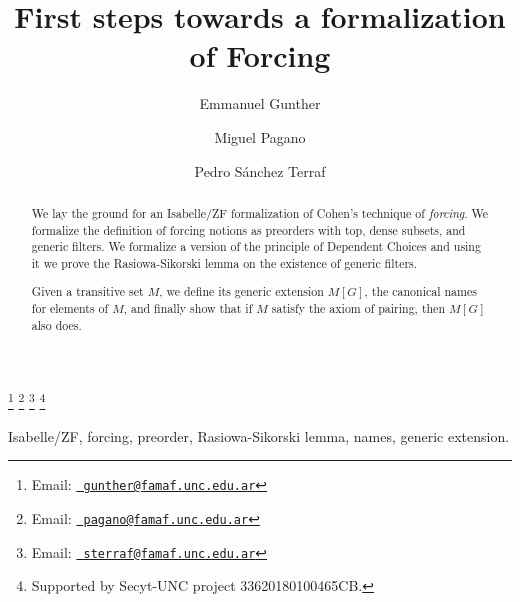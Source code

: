 \documentclass[9pt]{entcs} \usepackage{entcsmacro}
\begin{document}
\begin{frontmatter}
  \title{First steps towards a formalization of Forcing}
  \author{Emmanuel Gunther%
    }
  \address{FaMAF\\ Universidad Nacional de C\'ordoba\\
    C\'ordoba, Argentina} \author{Miguel Pagano}
  \address{FaMAF\\Universidad Nacional de C\'ordoba\\
    C\'ordoba, Argentina}
  \author{Pedro S\'anchez Terraf}
  \address{CIEM-FaMAF\\Universidad Nacional de C\'ordoba\\
    C\'ordoba, Argentina}
 \thanks[myemail]{Email:
    \href{mailto:gunther@famaf.unc.edu.ar} {\texttt{\normalshape
        gunther@famaf.unc.edu.ar}}} \thanks[coemail]{Email:
    \href{mailto:pagano@famaf.unc.edu.ar} {\texttt{\normalshape
        pagano@famaf.unc.edu.ar}}}  \thanks[co2email]{Email:
    \href{mailto:sterraf@famaf.unc.edu.ar} {\texttt{\normalshape
        sterraf@famaf.unc.edu.ar}}} 
 \thanks[ALL]{Supported by Secyt-UNC project 33620180100465CB.} 
\begin{abstract} 
  We lay the ground for an Isabelle/ZF formalization of Cohen's technique of
  \emph{forcing}. We formalize the definition of forcing notions as
  preorders with top, dense subsets, and generic filters. We formalize
  a version of the principle of Dependent Choices and using it
  we prove the Rasiowa-Sikorski lemma on the existence of generic filters.
  
  Given a transitive set $M$, we define its generic extension $M[G]$,
  the canonical names for elements of $M$, and finally show that if $M$
  satisfy the axiom of pairing, then $M[G]$ also does.
\end{abstract}
\begin{keyword}
Isabelle/ZF, forcing, preorder, Rasiowa-Sikorski lemma, names, generic extension.
\end{keyword}
\end{frontmatter}






















\end{document}
